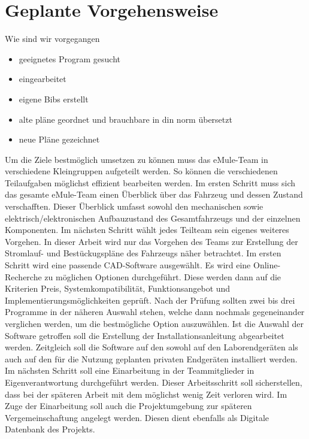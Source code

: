 \section*{Geplante Vorgehensweise}
	 Wie sind wir vorgegangen
\begin{itemize}
	\item geeignetes Program gesucht
	\item eingearbeitet
	\item eigene Bibs erstellt
	\item alte pläne geordnet und brauchbare in din norm übersetzt
	\item neue Pläne gezeichnet
\end{itemize}
Um die Ziele bestmöglich umsetzen zu können muss das eMule-Team in verschiedene Kleingruppen aufgeteilt werden. So können die verschiedenen Teilaufgaben möglichst effizient bearbeiten werden. Im ersten Schritt muss sich das gesamte eMule-Team einen Überblick über das Fahrzeug und dessen Zustand verschafften. Dieser Überblick umfasst sowohl den mechanischen sowie elektrisch/elektronischen Aufbauzustand des Gesamtfahrzeugs und der einzelnen Komponenten. Im nächsten Schritt wählt jedes Teilteam sein eigenes weiteres Vorgehen. In dieser Arbeit wird nur das Vorgehen des Teams zur \glqq Erstellung der Stromlauf- und Bestückugspläne des Fahrzeugs \grqq näher betrachtet. \newline
Im ersten Schritt wird eine passende CAD-Software ausgewählt. Es wird eine Online-Recherche zu möglichen Optionen durchgeführt. Diese werden dann auf die Kriterien Preis, Systemkompatibilität, Funktionsangebot und Implementierungsmöglichkeiten geprüft. Nach der Prüfung sollten zwei bis drei Programme in der näheren Auswahl stehen, welche dann nochmals gegeneinander verglichen werden, um die bestmögliche Option auszuwählen.\newline
Ist die Auswahl der Software getroffen soll die Erstellung der Installationsanleitung abgearbeitet werden. Zeitgleich soll die Software auf den sowohl auf den Laborendgeräten als auch auf den für die Nutzung geplanten privaten Endgeräten installiert werden. \newline
Im nächsten Schritt soll eine Einarbeitung in der Teammitglieder in Eigenverantwortung durchgeführt werden. Dieser Arbeitsschritt soll sicherstellen, dass bei der späteren Arbeit mit dem möglichst wenig Zeit verloren wird. Im Zuge der Einarbeitung soll auch die Projektumgebung zur späteren Vergemeinschaftung angelegt werden. Diesen dient ebenfalls als Digitale Datenbank des Projekts. \newline
